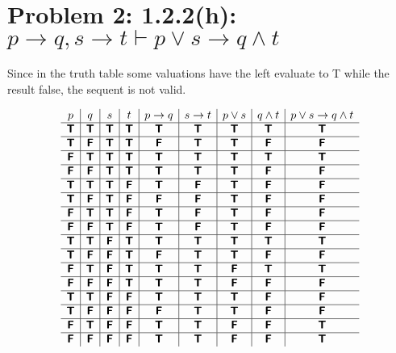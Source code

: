 \documentclass[11pt,leqno,fleqn]{article}
\begin{document}
\section{Problem 2: 1.2.2(h): $p \to q, s\to t \vdash p \lor s \to q \land t$}
 Since in the truth table some valuations have the left evaluate to T while the result false,
 the sequent is not valid.


\newcommand{\TTT}{\bm{\mathsf{T}}}
\newcommand{\FFF}{\bm{\mathsf{F}}}


\[
\begin{array}{ c | c | c | c | c | c | c | c | c }
 p & q & s &  t
    & p \to q & s\to t  & p \lor s &  q \land t &  p \lor s \to q \land t

\\ \hline 
 \TTT & \TTT & \TTT & \TTT & \TTT & \TTT &  \TTT & \TTT & \TTT
\\ \hline  
 \TTT & \FFF & \TTT & \TTT & \FFF  & \TTT  &  \TTT  & \FFF & \FFF
\\ \hline  
 \FFF & \TTT & \TTT & \TTT & \TTT  & \TTT  &   \TTT & \TTT & \TTT
\\ \hline  
 \FFF & \FFF & \TTT & \TTT & \TTT  & \TTT &     \TTT & \FFF & \FFF

\\ \hline 
 \TTT & \TTT & \TTT & \FFF & \TTT  & \FFF  &  \TTT & \FFF & \FFF
\\ \hline  
 \TTT & \FFF & \TTT & \FFF & \FFF  &  \FFF &  \TTT   & \FFF  & \FFF
\\ \hline  
 \FFF & \TTT & \TTT & \FFF & \TTT & \FFF &     \TTT & \FFF & \FFF
\\ \hline  
 \FFF & \FFF & \TTT & \FFF & \TTT & \FFF  &     \TTT & \FFF & \FFF


\\ \hline 
 \TTT & \TTT & \FFF & \TTT & \TTT  & \TTT  &  \TTT  & \TTT & \TTT
\\ \hline  
 \TTT & \FFF & \FFF & \TTT & \FFF  &  \TTT &  \TTT    & \FFF & \FFF
\\ \hline  
 \FFF & \TTT & \FFF & \TTT & \TTT  & \TTT  &  \FFF  &  \TTT & \TTT
\\ \hline  
 \FFF & \FFF & \FFF & \TTT & \TTT  & \TTT  &  \FFF   & \FFF & \FFF

\\ \hline 
 \TTT & \TTT & \FFF & \FFF & \TTT  & \TTT  & \TTT  & \FFF & \FFF
\\ \hline  
 \TTT & \FFF & \FFF & \FFF & \FFF  & \TTT  &  \TTT   & \FFF & \FFF
\\ \hline  
 \FFF & \TTT & \FFF & \FFF & \TTT  &  \TTT &  \FFF   & \FFF &  \TTT
\\ \hline  
 \FFF & \FFF & \FFF & \FFF & \TTT  & \TTT  & \FFF & \FFF &  \TTT


\end{array}
\]
\end{document}
